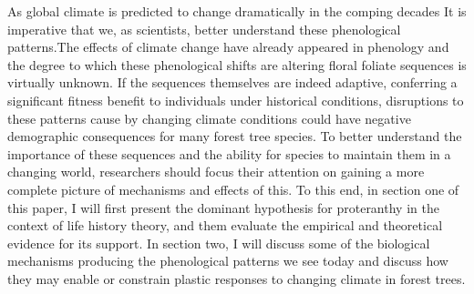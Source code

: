 \documentclass{article}\usepackage[]{graphicx}\usepackage[]{color}
\begin{document}
\par As global climate is predicted to change dramatically in the comping decades It is imperative that we, as scientists, better understand these phenological patterns.The effects of climate change have already appeared in phenology \citep{Menzel2006} and the degree to which these phenological shifts are altering floral foliate sequences is virtually unknown. If the sequences themselves are indeed adaptive, conferring a significant fitness benefit to individuals under historical conditions, disruptions to these patterns cause by changing climate conditions could have negative demographic consequences for many forest tree species. To better understand the importance of these sequences and the ability for species to maintain them in a changing world, researchers should focus their attention on gaining a more complete picture of mechanisms and effects of this. To this end, in section one of this paper, I will first present the dominant hypothesis for proteranthy in the context of life history theory, and them evaluate the empirical and theoretical evidence for its support. In section two, I will discuss some of the biological mechanisms producing the phenological patterns we see today and discuss how they may enable or constrain plastic responses to changing climate in forest trees.
\end{document}
